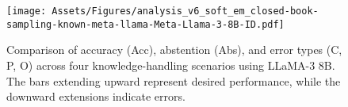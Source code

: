 \begin{figure}[t]
    \centering
    \texttt{[image: Assets/Figures/analysis\_v6\_soft\_em\_closed-book-sampling-known-meta-llama-Meta-Llama-3-8B-ID.pdf]} 
    \caption{ Comparison of accuracy (Acc), abstention (Abs), and error types (C, P, O) across four knowledge-handling scenarios using LLaMA-3 8B. The bars extending upward represent desired performance, while the downward extensions indicate errors.}
    \label{figure:eval_v6_ID}
\end{figure}
